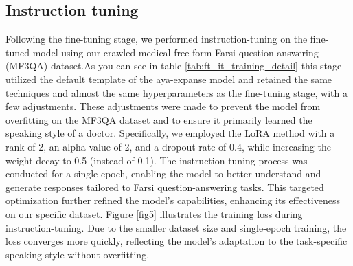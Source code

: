 \documentclass[conference]{IEEEtran}
\begin{document}
	\subsection{Instruction tuning}
Following the fine-tuning stage, we performed instruction-tuning on the fine-tuned model using our crawled medical free-form Farsi question-answering (MF3QA) dataset.As you can see in table \ref{tab:ft_it_training_detail} this stage utilized the default template of the aya-expanse model and retained the same techniques and almost the same hyperparameters as the fine-tuning stage, with a few adjustments. These adjustments were made to prevent the model from overfitting on the MF3QA dataset and to ensure it primarily learned the speaking style of a doctor. Specifically, we employed the LoRA method with a rank of 2, an alpha value of 2, and a dropout rate of 0.4, while increasing the weight decay to 0.5 (instead of 0.1). The instruction-tuning process was conducted for a single epoch, enabling the model to better understand and generate responses tailored to Farsi question-answering tasks. This targeted optimization further refined the model’s capabilities, enhancing its effectiveness on our specific dataset.
Figure \ref{fig5} illustrates the training loss during instruction-tuning. Due to the smaller dataset size and single-epoch training, the loss converges more quickly, reflecting the model’s adaptation to the task-specific speaking style without overfitting.  
\end{document}
